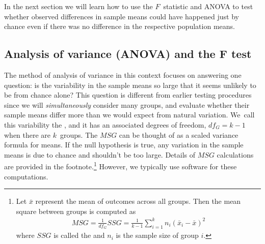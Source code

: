In the next section we will learn how to use the $F$~statistic
and ANOVA to test whether observed differences in sample means
could have happened just by chance even if there was no
difference in the respective population means.


\D{\newpage}

\subsection{Analysis of variance (ANOVA) and the F test}

The method of analysis of variance in this context focuses
on answering one question:
is the variability in the sample means so large that it seems
unlikely to be from chance alone?
This question is different from earlier testing procedures
since we will \emph{simultaneously} consider many groups,
and evaluate whether their sample means differ more than
we would expect from natural variation.
We~call this variability the
,
and it has an associated degrees of freedom,
$df_{G} = k - 1$ when there are
$k$~groups.
The $MSG$ can be thought of as a scaled variance formula
for means.
If the null hypothesis is true, any variation in the sample
means is due to chance and shouldn't be too large.
Details of $MSG$ calculations are provided in the
footnote.\footnote{Let $\bar{x}$ represent the mean of
  outcomes across all groups.
  Then the mean square between groups is computed as
  \begin{align*}
  MSG
    = \frac{1}{df_{G}}SSG
    = \frac{1}{k-1}\sum_{i=1}^{k} n_{i}
        \left(\bar{x}_{i} - \bar{x}\right)^2
  \end{align*}
  where $SSG$ is called the 
  and $n_{i}$ is the sample size of group $i$.}
However, we typically use software for these computations.

